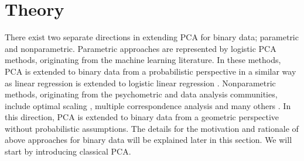 \section{Theory}
There exist two separate directions in extending PCA for binary data; parametric and nonparametric. Parametric approaches are represented by logistic PCA methods, originating from the machine learning literature. In these methods, PCA is extended to binary data from a probabilistic perspective in a similar way as linear regression is extended to logistic linear regression \cite{collins2001generalization, schein2003generalized, landgraf2015generalized}. Nonparametric methods, originating from the psychometric and data analysis communities, include optimal scaling \cite{de2009gifi}, multiple correspondence analysis \cite{mori2016nonlinear} and many others \cite{kiers1989three}. In this direction, PCA is extended to binary data from a geometric perspective without probabilistic assumptions. The details for the motivation and rationale of above approaches for binary data will be explained later in this section. We will start by introducing classical PCA.

